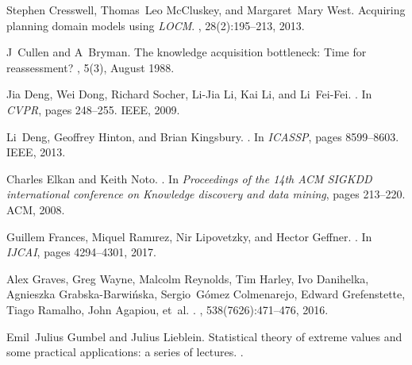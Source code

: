 \documentclass[11pt]{article}
\begin{document}
\begin{thebibliography}{}
Stephen Cresswell, Thomas~Leo McCluskey, and Margaret~Mary West.
\newblock Acquiring planning domain models using \emph{LOCM}.
, 28(2):195--213, 2013.

J~Cullen and A~Bryman.
\newblock The knowledge acquisition bottleneck: Time for reassessment?
, 5(3), August 1988.

Jia Deng, Wei Dong, Richard Socher, Li-Jia Li, Kai Li, and Li~Fei-Fei.
.
\newblock In {\em {CVPR}}, pages 248--255. IEEE, 2009.

Li~Deng, Geoffrey Hinton, and Brian Kingsbury.
.
\newblock In {\em {ICASSP}}, pages 8599--8603. IEEE, 2013.

Charles Elkan and Keith Noto.
.
\newblock In {\em Proceedings of the 14th ACM SIGKDD international conference
  on Knowledge discovery and data mining}, pages 213--220. ACM, 2008.

Guillem Frances, Miquel Ram{\i}rez, Nir Lipovetzky, and Hector Geffner.
.
\newblock In {\em {IJCAI}}, pages 4294--4301, 2017.

Alex Graves, Greg Wayne, Malcolm Reynolds, Tim Harley, Ivo Danihelka, Agnieszka
  Grabska-Barwi{\'n}ska, Sergio~G{\'o}mez Colmenarejo, Edward Grefenstette,
  Tiago Ramalho, John Agapiou, et~al.
.
, 538(7626):471--476, 2016.

Emil~Julius Gumbel and Julius Lieblein.
\newblock Statistical theory of extreme values and some practical applications:
  a series of lectures.
.


\end{thebibliography}
\end{document}
